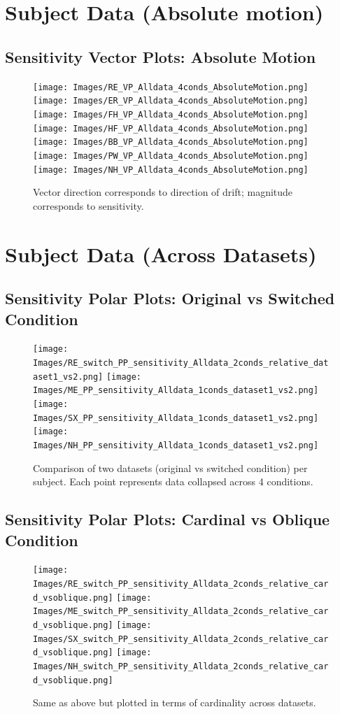 \documentclass[11pt]{article} %
\begin{document}
\newpage
\section{Subject Data (Absolute motion)}
\subsection{Sensitivity Vector Plots: Absolute Motion}
\begin{figure}[H]
\centering %
\texttt{[image: Images/RE\_VP\_Alldata\_4conds\_AbsoluteMotion.png]}
\texttt{[image: Images/ER\_VP\_Alldata\_4conds\_AbsoluteMotion.png]}
\texttt{[image: Images/FH\_VP\_Alldata\_4conds\_AbsoluteMotion.png]}
\texttt{[image: Images/HF\_VP\_Alldata\_4conds\_AbsoluteMotion.png]}
\texttt{[image: Images/BB\_VP\_Alldata\_4conds\_AbsoluteMotion.png]}
\texttt{[image: Images/PW\_VP\_Alldata\_4conds\_AbsoluteMotion.png]}
\texttt{[image: Images/NH\_VP\_Alldata\_4conds\_AbsoluteMotion.png]}
\caption{Vector direction corresponds to direction of drift; magnitude corresponds to sensitivity.}
\end{figure}

\newpage
\section{Subject Data (Across Datasets)}
\subsection{Sensitivity Polar Plots: Original vs Switched Condition}
\begin{figure}[H]
\centering %
\texttt{[image: Images/RE\_switch\_PP\_sensitivity\_Alldata\_2conds\_relative\_dataset1\_vs2.png]}
\texttt{[image: Images/ME\_PP\_sensitivity\_Alldata\_1conds\_dataset1\_vs2.png]}
\texttt{[image: Images/SX\_PP\_sensitivity\_Alldata\_1conds\_dataset1\_vs2.png]}
\texttt{[image: Images/NH\_PP\_sensitivity\_Alldata\_1conds\_dataset1\_vs2.png]}
\caption{Comparison of two datasets (original vs switched condition) per subject. Each point represents data collapsed across 4 conditions.}
\end{figure}
\subsection{Sensitivity Polar Plots: Cardinal vs Oblique Condition}
\begin{figure}[H]
\centering %
\texttt{[image: Images/RE\_switch\_PP\_sensitivity\_Alldata\_2conds\_relative\_card\_vsoblique.png]}
\texttt{[image: Images/ME\_switch\_PP\_sensitivity\_Alldata\_2conds\_relative\_card\_vsoblique.png]}
\texttt{[image: Images/SX\_switch\_PP\_sensitivity\_Alldata\_2conds\_relative\_card\_vsoblique.png]}
\texttt{[image: Images/NH\_switch\_PP\_sensitivity\_Alldata\_2conds\_relative\_card\_vsoblique.png]}
\caption{Same as above but plotted in terms of cardinality across datasets.}
\end{figure}
\end{document}
